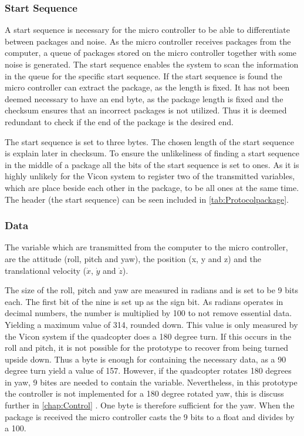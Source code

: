 \subsubsection{Start Sequence}
A start sequence is necessary for the micro controller to be able to differentiate between packages and noise. As the micro controller receives packages from the computer, a queue of packages stored on the micro controller together with some noise is generated. The start sequence enables the system to scan the information in the queue for the specific start sequence. If the start sequence is found the micro controller can extract the package, as the length is fixed. It has not been deemed necessary to have an end byte, as the package length is fixed and the checksum ensures that an incorrect packages is not utilized. Thus it is deemed redundant to check if the end of the package is the desired end.

The start sequence is set to three bytes. The chosen length of the start sequence is explain later in checksum. To ensure the unlikeliness of finding a start sequence in the middle of a package all the bits of the start sequence is set to ones. As it is highly unlikely for the Vicon system to register two of the transmitted variables, which are place beside each other in the package, to be all ones at the same time. The header (the start sequence) can be seen included in \autoref{tab:Protocolpackage}.

\subsubsection{Data}
The variable which are transmitted from the computer to the micro controller, are the attitude (roll, pitch and yaw), the position (x, y and z) and the translational velocity ($\dot{x}$, $\dot{y}$ and $\dot{z}$).

The size of the roll, pitch and yaw are measured in radians and is set to be 9 bits each. The first bit of the nine is set up as the sign bit. As radians operates in decimal numbers, the number is multiplied by 100 to not remove essential data. Yielding a maximum value of 314, rounded down. This value is only measured by the Vicon system if the quadcopter does a 180 degree turn. If this occurs in the roll and pitch, it is not possible for the prototype to recover from being turned upside down. Thus a byte is enough for containing the necessary data, as a 90 degree turn yield a value of 157. However, if the quadcopter rotates 180 degrees in yaw, 9 bites are needed to contain the variable. Nevertheless, in this prototype the controller is not implemented for a 180 degree rotated yaw, this is discuss further in \autoref{chap:Control} . One byte is therefore sufficient for the yaw. When the package is received the micro controller casts the 9 bits to a float and divides by a 100.

